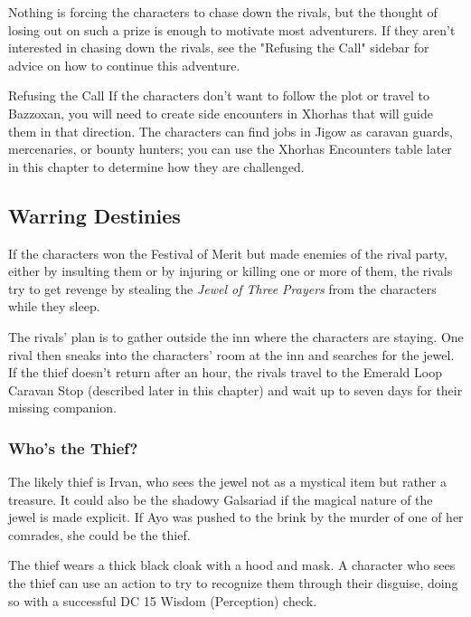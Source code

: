 \documentclass[10pt,a4paper,twoside,bg=print,twocolumn,openany,nodeprecatedcode]{dndbook}
\begin{document}
Nothing is forcing the characters to chase down the rivals, but the thought of losing out on such a prize is enough to motivate most adventurers. If they aren't interested in chasing down the rivals, see the "Refusing the Call" sidebar for advice on how to continue this adventure.

\begin{DndSidebar}[float=!b]{Refusing the Call}
If the characters don't want to follow the plot or travel to Bazzoxan, you will need to create side encounters in Xhorhas that will guide them in that direction. The characters can find jobs in Jigow as caravan guards, mercenaries, or bounty hunters; you can use the Xhorhas Encounters table later in this chapter to determine how they are challenged.



\end{DndSidebar}

\subsection{Warring Destinies}
If the characters won the Festival of Merit but made enemies of the rival party, either by insulting them or by injuring or killing one or more of them, the rivals try to get revenge by stealing the \textit{Jewel of Three Prayers} from the characters while they sleep.

The rivals' plan is to gather outside the inn where the characters are staying. One rival then sneaks into the characters' room at the inn and searches for the jewel. If the thief doesn't return after an hour, the rivals travel to the Emerald Loop Caravan Stop (described later in this chapter) and wait up to seven days for their missing companion.

\subsubsection{Who's the Thief?}
The likely thief is Irvan, who sees the jewel not as a mystical item but rather a treasure. It could also be the shadowy Galsariad if the magical nature of the jewel is made explicit. If Ayo was pushed to the brink by the murder of one of her comrades, she could be the thief.

The thief wears a thick black cloak with a hood and mask. A character who sees the thief can use an action to try to recognize them through their disguise, doing so with a successful DC 15 Wisdom (Perception) check.
\end{document}
